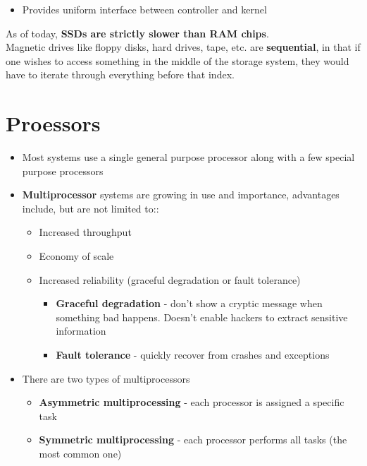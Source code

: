 \documentclass[12pt]{book}
\begin{document}
\begin{itemize}
    \item Provides uniform interface between controller and kernel
\end{itemize}

As of today, \textbf{SSDs are strictly slower than RAM chips}.\\

Magnetic drives like floppy disks, hard drives, tape, etc. are \textbf{sequential}, in that if one wishes to access something in the middle of the storage system, they would have to iterate through everything before that index.

\section*{Proessors}

\begin{itemize}
    \item Most systems use a single general purpose processor along with a few special purpose processors
    \item \textbf{Multiprocessor} systems are growing in use and importance, advantages include, but are not limited to::
    \begin{itemize}
        \item Increased throughput
        \item Economy of scale
        \item Increased reliability (graceful degradation or fault tolerance)
        \begin{itemize}
            \item \textbf{Graceful degradation} - don't show a cryptic message when something bad happens. Doesn't enable hackers to extract sensitive information
            \item \textbf{Fault tolerance} - quickly recover from crashes and exceptions
        \end{itemize}
    \end{itemize}
    \item There are two types of multiprocessors
    \begin{itemize}
        \item \textbf{Asymmetric multiprocessing} - each processor is assigned a specific task
        \item \textbf{Symmetric multiprocessing} - each processor performs all tasks (the most common one)
    \end{itemize}
\end{itemize}
\end{document}
